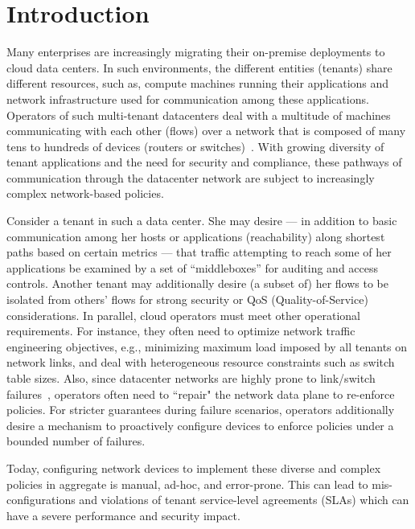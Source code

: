 \section{Introduction}

Many enterprises are increasingly migrating their on-premise
deployments to cloud data centers. In such environments, the different
entities (tenants) share different resources, such as, compute
machines running their applications and network infrastructure used
for communication among these applications.  Operators of such
multi-tenant datacenters deal with a multitude of machines
communicating with each other (flows) over a network that is composed
of many tens to hundreds of devices (routers or
switches)~\cite{mpa-imc15}. With growing diversity of tenant
applications and the need for security and compliance, these pathways
of communication through the datacenter network are subject to
increasingly complex network-based policies.

Consider a tenant in such a data center. She may desire --- in
addition to basic communication among her hosts or applications
(reachability) along shortest paths based on certain metrics --- that
traffic attempting to reach some of her applications be examined by a
set of ``middleboxes'' for auditing and access controls. Another
tenant may additionally desire (a subset of) her flows to be isolated
from others' flows for strong security or QoS (Quality-of-Service)
considerations.  In parallel, cloud operators must meet other
operational requirements. For instance, they often need to optimize
network traffic engineering objectives, e.g., minimizing maximum load
imposed by all tenants on network links, and deal with heterogeneous
resource constraints such as switch table sizes. Also, since
datacenter networks are highly prone to link/switch
failures~\cite{gill-sigcomm11}, operators often need to ``repair" the
network data plane to re-enforce policies. For stricter guarantees
during failure scenarios, operators additionally desire a mechanism to
proactively configure devices to enforce policies under a bounded
number of failures.

Today, configuring network devices to implement these diverse and
complex policies in aggregate is manual, ad-hoc, and error-prone.
This can lead to mis-configurations and violations of tenant
service-level agreements (SLAs) which can have a severe performance
and security impact.

